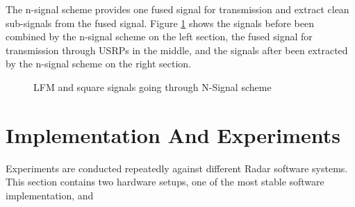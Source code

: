\documentclass[letterpaper, 12 pt, conference]{report}
\numberwithin{figure}{section}
\begin{document}
The n-signal scheme provides one fused signal for transmission and extract clean sub-signals from the fused signal. Figure \ref{fig:lfmBW2Nsq} shows the signals before been combined by the n-signal scheme on the left section, the fused signal for transmission through USRPs in the middle, and the signals after been extracted by the n-signal scheme on the right section. 
\begin{figure}[h]
\noindent{}
\noindent{}
\noindent{}
\caption{LFM and square signals going through N-Signal scheme}
\label{fig:lfmBW2Nsq}
\end{figure}
\FloatBarrier 
\newpage
\section{Implementation And Experiments}
Experiments are conducted repeatedly against different Radar software systems. This section contains two hardware setups, one of the most stable software implementation, and 
\end{document}
